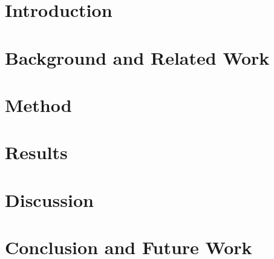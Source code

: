 \documentclass[]{csthesis}
\begin{document}

\maketitle

% 





\thesisTables

\thesisBodyStart



\chapter{Introduction}


\chapter{Background and Related Work}


\chapter{Method}


\chapter{Results}


\chapter{Discussion}


\chapter{Conclusion and Future Work}




\printReferences
\end{document}

